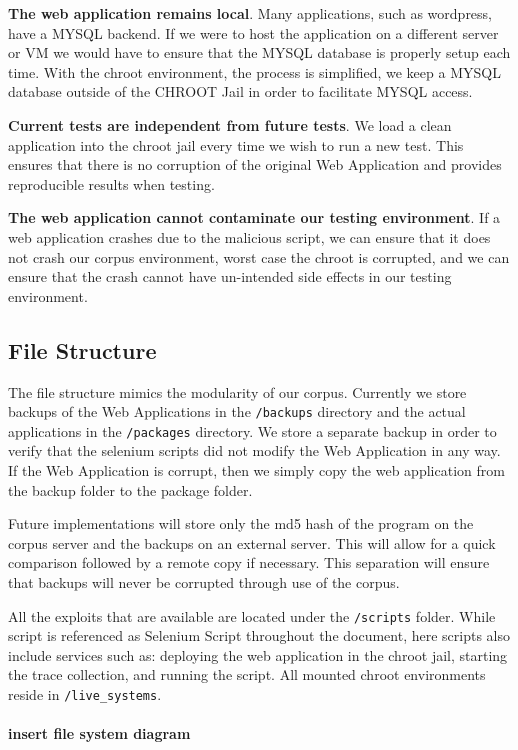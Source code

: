 \documentclass[letterpaper,twocolumn,10pt]{article}
\begin{document}
{\bf The web application remains local}.  Many applications, such as wordpress, have a MYSQL backend.  If we were to host the application on a different server or VM we would have to ensure that the MYSQL database is properly setup each time.  With the chroot environment, the process is simplified, we keep a MYSQL database outside of the CHROOT Jail in order to facilitate MYSQL access.  

{\bf Current tests are independent from future tests}.  We load a clean application into the chroot jail every time we wish to run a new test.  This ensures that there is no corruption of the original Web Application and provides reproducible results when testing.

{\bf The web application cannot contaminate our testing environment}.  If a web application crashes due to the malicious script, we can ensure that it does not crash our corpus environment, worst case the chroot is corrupted, and we can ensure that the crash cannot have un-intended side effects in our testing environment.  


\subsection{File Structure}

The file structure mimics the modularity of our corpus.  Currently we store backups of the Web Applications in the {\tt/backups} directory and the actual applications in the {\tt/packages} directory.  We store a separate backup in order to verify that the selenium scripts did not modify the Web Application in any way.  If the Web Application is corrupt, then we simply copy the web application from the backup folder to the package folder.  

Future implementations will store only the md5 hash of the program on the corpus server and the backups on an external server.  This will allow for a quick comparison followed by a remote copy if necessary.  This separation will ensure that backups will never be corrupted through use of the corpus.  

All the exploits that are available are located under the {\tt /scripts} folder.  While script is referenced as Selenium Script throughout the document, here scripts also include services such as: deploying the web application in the chroot jail, starting the trace collection, and running the script. All mounted chroot environments reside in {\tt /live\_systems}. 
\\\\
{\bf insert file system diagram}
\end{document}
